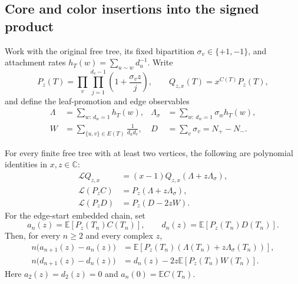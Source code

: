 \subsection{Core and color insertions into the signed product}
\label{bpi:section}

Work with the original free tree, its fixed bipartition
$\sigma_v\in\{+1,-1\}$, and attachment rates
$h_T(w)=\sum_{u\sim w}d_u^{-1}$.  Write
\[
 P_z(T)=\prod_v\prod_{j=1}^{d_v-1}
        \left(1+\frac{\sigma_vz}{j}\right),
 \qquad Q_{z,x}(T)=x^{C(T)}P_z(T),
\]
and define the leaf-promotion and edge observables
\begin{align*}
 \Lambda&=\sum_{w:\,d_w=1}h_T(w),&
 \Lambda_\sigma&=\sum_{w:\,d_w=1}\sigma_wh_T(w),\\
 W&=\sum_{\{u,v\}\in E(T)}\frac1{d_ud_v},&
 D&=\sum_v\sigma_v=N_+-N_-.
\end{align*}

\begin{proposition}
\label{bpi:identities}
For every finite free tree with at least two vertices, the following are
polynomial identities in $x,z\in\mathbb C$:
\begin{align}
 \mathcal LQ_{z,x}
   &=(x-1)Q_{z,x}(\Lambda+z\Lambda_\sigma),
       \label{bpi:fugacity}\\
 \mathcal L(P_zC)
   &=P_z(\Lambda+z\Lambda_\sigma),
       \label{bpi:core}\\
 \mathcal L(P_zD)
   &=P_z(D-2zW).
       \label{bpi:color}
\end{align}
For the edge-start embedded chain, set
\[
 a_n(z)=\mathbb E[P_z(T_n)C(T_n)],\qquad
 d_n(z)=\mathbb E[P_z(T_n)D(T_n)].
\]
Then, for every $n\geq2$ and every complex $z$,
\begin{align}
 n\bigl(a_{n+1}(z)-a_n(z)\bigr)
   &=\mathbb E\!\left[P_z(T_n)
                (\Lambda(T_n)+z\Lambda_\sigma(T_n))\right],
       \label{bpi:population-core}\\
 n\bigl(d_{n+1}(z)-d_n(z)\bigr)
   &=d_n(z)-2z\mathbb E[P_z(T_n)W(T_n)].
       \label{bpi:population-color}
\end{align}
Here $a_2(z)=d_2(z)=0$ and $a_n(0)=\mathbb EC(T_n)$.
\end{proposition}

